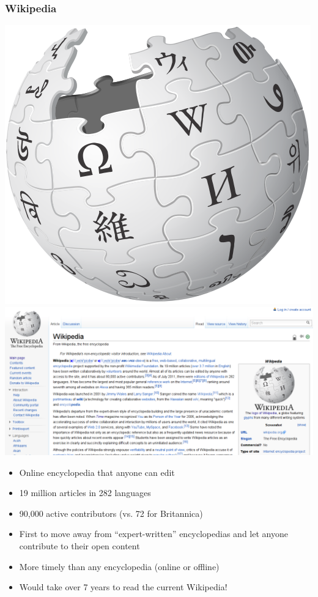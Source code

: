 \documentclass{beamer}
\begin{document}
\begin{frame}
  \frametitle{Wikipedia}
  \begin{center} \includegraphics[height=0.35\textheight]{img/wikipedia}\hspace{1em} \includegraphics[height=0.35\textheight]{img/wikiwiki} \end{center}
  
  \begin{itemize}
  \item Online encyclopedia that anyone can edit
  \item 19 million articles in 282 languages
  \item 90,000 active contributors (vs. 72 for Britannica)
  \item First to move away from ``expert-written'' encyclopedias and let anyone contribute to their open content
  \item More timely than any encyclopedia (online or offline)
  \item Would take over 7 years to read the current Wikipedia!
  \end{itemize}
\end{frame}
\end{document}
